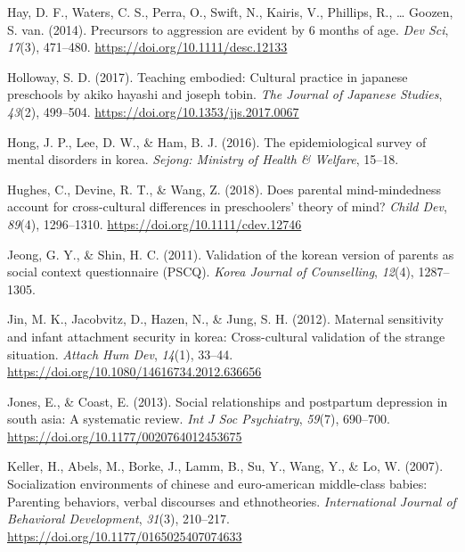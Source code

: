 \documentclass[
]{article}
\newlength{\cslhangindent}
\newlength{\cslentryspacingunit} %
\newenvironment{CSLReferences}[2] %
 {%
  \setlength{\parindent}{0pt}
  \ifodd #1
  \let\oldpar\par
  \def\par{\hangindent=\cslhangindent\oldpar}
  \fi
  \setlength{\parskip}{#2\cslentryspacingunit}
 }%
 {}
\begin{document}
\begin{CSLReferences}{1}{0}
\leavevmode{}%
Hay, D. F., Waters, C. S., Perra, O., Swift, N., Kairis, V., Phillips, R., \ldots{} Goozen, S. van. (2014). Precursors to aggression are evident by 6 months of age. \emph{Dev Sci}, \emph{17}(3), 471--480. \url{https://doi.org/10.1111/desc.12133}

\leavevmode{}%
Holloway, S. D. (2017). Teaching embodied: Cultural practice in japanese preschools by akiko hayashi and joseph tobin. \emph{The Journal of Japanese Studies}, \emph{43}(2), 499--504. \url{https://doi.org/10.1353/jjs.2017.0067}

\leavevmode{}%
Hong, J. P., Lee, D. W., \& Ham, B. J. (2016). The epidemiological survey of mental disorders in korea. \emph{Sejong: Ministry of Health \& Welfare}, 15--18.

\leavevmode{}%
Hughes, C., Devine, R. T., \& Wang, Z. (2018). Does parental mind-mindedness account for cross-cultural differences in preschoolers' theory of mind? \emph{Child Dev}, \emph{89}(4), 1296--1310. \url{https://doi.org/10.1111/cdev.12746}

\leavevmode{}%
Jeong, G. Y., \& Shin, H. C. (2011). Validation of the korean version of parents as social context questionnaire (PSCQ). \emph{Korea Journal of Counselling}, \emph{12}(4), 1287--1305.

\leavevmode{}%
Jin, M. K., Jacobvitz, D., Hazen, N., \& Jung, S. H. (2012). Maternal sensitivity and infant attachment security in korea: Cross-cultural validation of the strange situation. \emph{Attach Hum Dev}, \emph{14}(1), 33--44. \url{https://doi.org/10.1080/14616734.2012.636656}

\leavevmode{}%
Jones, E., \& Coast, E. (2013). Social relationships and postpartum depression in south asia: A systematic review. \emph{Int J Soc Psychiatry}, \emph{59}(7), 690--700. \url{https://doi.org/10.1177/0020764012453675}

\leavevmode{}%
Keller, H., Abels, M., Borke, J., Lamm, B., Su, Y., Wang, Y., \& Lo, W. (2007). Socialization environments of chinese and euro-american middle-class babies: Parenting behaviors, verbal discourses and ethnotheories. \emph{International Journal of Behavioral Development}, \emph{31}(3), 210--217. \url{https://doi.org/10.1177/0165025407074633}


\end{CSLReferences}
\end{document}
